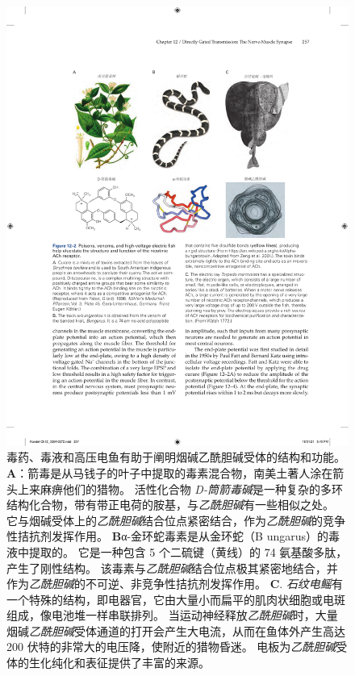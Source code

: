 \begin{figure}[htbp]
	\centering
	\includegraphics[width=1.0\linewidth]{chap12/fig_12_2}
	\caption{毒药、毒液和高压电鱼有助于阐明烟碱乙酰胆碱受体的结构和功能。 
	\textbf{A}：箭毒是从马钱子的叶子中提取的毒素混合物，南美土著人涂在箭头上来麻痹他们的猎物。
	活性化合物 \textit{D-筒箭毒碱}是一种复杂的多环结构化合物，带有带正电荷的胺基，与\textit{乙酰胆碱}有一些相似之处。
	它与烟碱受体上的\textit{乙酰胆碱}结合位点紧密结合，作为\textit{乙酰胆碱}的竞争性拮抗剂发挥作用。
	\textbf{B}α-金环蛇毒素是从金环蛇（B ungarus）的毒液中提取的。
	它是一种包含 5 个二硫键（黄线）的 74 氨基酸多肽，产生了刚性结构。
	该毒素与\textit{乙酰胆碱}结合位点极其紧密地结合，并作为\textit{乙酰胆碱}的不可逆、非竞争性拮抗剂发挥作用。
	\textbf{C}. \textit{石纹电鳐}有一个特殊的结构，即电器官，它由大量小而扁平的肌肉状细胞或电斑组成，像电池堆一样串联排列。
	当运动神经释放\textit{乙酰胆碱}时，大量烟碱\textit{乙酰胆碱}受体通道的打开会产生大电流，从而在鱼体外产生高达 200 伏特的非常大的电压降，使附近的猎物昏迷。
	电板为\textit{乙酰胆碱}受体的生化纯化和表征提供了丰富的来源。}
	\label{fig:12_2}
\end{figure}



